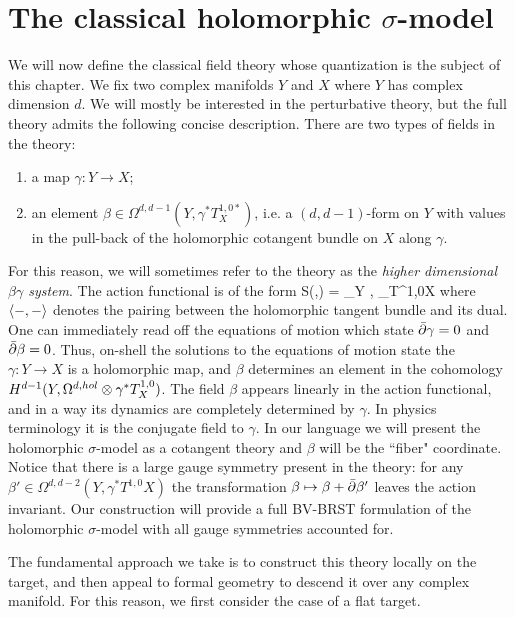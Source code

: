 \documentclass[10pt]{amsart}
\begin{document}
\section{The classical holomorphic $\sigma$-model}

We will now define the classical field theory whose quantization is the subject of this chapter.
We fix two complex manifolds $Y$ and $X$ where $Y$ has complex dimension $d$. 
We will mostly be interested in the perturbative theory, but the full theory admits the following concise description.
There are two types of fields in the theory:
\begin{enumerate}
\item a map $\gamma : Y \to X$;
\item an element $\beta \in \Omega^{d, d-1} (Y , \gamma^* T^{1,0*}_X)$, i.e. a $(d,d-1)$-form on $Y$ with values in the pull-back of the holomorphic cotangent bundle on $X$ along $\gamma$.
\end{enumerate}
For this reason, we will sometimes refer to the theory as the {\em higher dimensional $\beta\gamma$ system}.
The action functional is of the form 
\ben
S(\beta,\gamma) = \int_Y \<\beta, \dbar \gamma\>_{T^{1,0}X}
\een
where $\langle-,-\rangle$ denotes the pairing between the holomorphic tangent bundle and its dual.
One can immediately read off the equations of motion which state $\Bar{\partial} \gamma = 0$ and $\Bar{\partial} \beta = 0$.
Thus, on-shell the solutions to the equations of motion state the $\gamma : Y \to X$ is a holomorphic map, and $\beta$ determines an element in the cohomology $H^{d-1}(Y , \Omega^{d,hol} \otimes \gamma^* T_X^{1,0})$. 
The field $\beta$ appears linearly in the action functional, and in a way its dynamics are completely determined by $\gamma$. 
In physics terminology it is the conjugate field to $\gamma$. 
In our language we will present the holomorphic $\sigma$-model as a cotangent theory and $\beta$ will be the ``fiber" coordinate. 
Notice that there is a large gauge symmetry present in the theory: for any $\beta' \in \Omega^{d,d-2}(Y , \gamma^*T^{1,0}X)$ the transformation $\beta \mapsto \beta + \Bar{\partial} \beta'$ leaves the action invariant. 
Our construction will provide a full BV-BRST formulation of the holomorphic $\sigma$-model with all gauge symmetries accounted for. 

The fundamental approach we take is to construct this theory locally on the target, and then appeal to formal geometry to descend it over any complex manifold.
For this reason, we first consider the case of a flat target.
\end{document}
